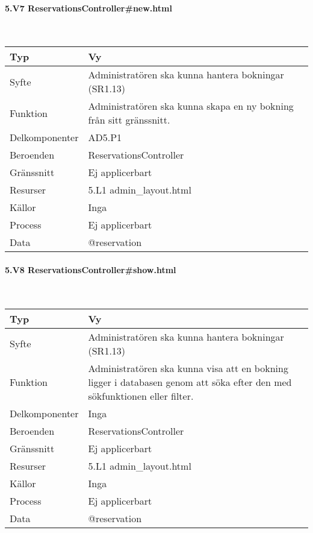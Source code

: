 \documentclass[a4paper, twoside, 11pt, titlepage]{article}
\begin{document}
			\paragraph{5.V7 ReservationsController\#new.html}\

			\begin {table} [ht] \begin{tabular} {  p{3.5cm} p{9.6cm} }
				\hline
				{Typ} & {Vy} \\
				\hline
				{Syfte} & {Administratören ska kunna hantera bokningar (SR1.13)} \\
				\hline
				{Funktion} & {Administratören ska kunna skapa en ny bokning från sitt gränssnitt.} \\
				\hline
				{Delkomponenter} & {AD5.P1} \\
				\hline
				{Beroenden} & {ReservationsController} \\
				\hline
				{Gränssnitt} & {Ej applicerbart} \\
				\hline
				{Resurser} & {5.L1 admin\_layout.html} \\
				\hline
				{Källor} & {Inga} \\
				\hline
				{Process} & {Ej applicerbart} \\
				\hline
				{Data} & {@reservation} \\
				\hline
			\end{tabular} \end{table} \FloatBarrier


			\paragraph{5.V8 ReservationsController\#show.html}\

			\begin {table} [ht] \begin{tabular} {  p{3.5cm} p{9.6cm} }
				\hline
				{Typ} & {Vy} \\
				\hline
				{Syfte} & {Administratören ska kunna hantera bokningar (SR1.13)} \\
				\hline
				{Funktion} & {Administratören ska kunna visa att en bokning ligger i databasen genom att söka efter den med sökfunktionen eller filter.} \\
				\hline
				{Delkomponenter} & {Inga} \\
				\hline
				{Beroenden} & {ReservationsController} \\
				\hline
				{Gränssnitt} & {Ej applicerbart} \\
				\hline
				{Resurser} & {5.L1 admin\_layout.html} \\
				\hline
				{Källor} & {Inga} \\
				\hline
				{Process} & {Ej applicerbart} \\
				\hline
				{Data} & {@reservation} \\
				\hline
			\end{tabular} \end{table} \FloatBarrier
\end{document}
